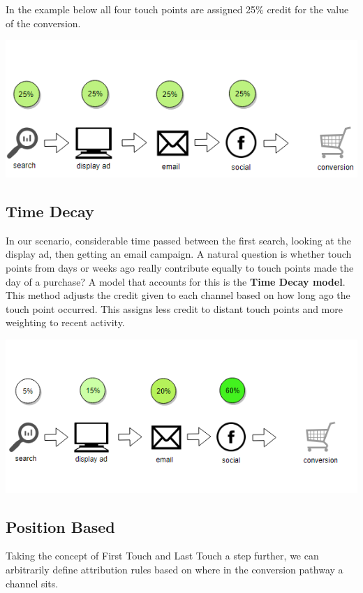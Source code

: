 \documentclass[]{book}
\begin{document}
In the example below all four touch points are assigned 25\% credit for the value
of the conversion.

\includegraphics[width=5.61in]{img/linear}

\hypertarget{time-decay}{%
\subsection{Time Decay}\label{time-decay}}

In our scenario, considerable time passed between the first search, looking
at the display ad, then getting an email campaign. A natural question is whether
touch points from days or weeks ago really contribute equally to touch points made
the day of a purchase? A model that accounts for this is the \textbf{Time Decay model}.
This method adjusts the credit given to each channel based on how long ago the
touch point occurred. This assigns less credit to distant touch points and more
weighting to recent activity.

\includegraphics[width=5.92in]{img/time_decay}

\hypertarget{position-based}{%
\subsection{Position Based}\label{position-based}}

Taking the concept of First Touch and Last Touch a step further, we can arbitrarily
define attribution rules based on where in the conversion pathway a channel sits.
\end{document}
